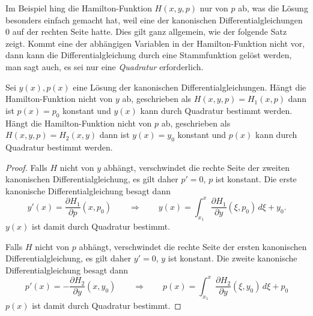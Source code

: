 Im Beispiel hing die Hamilton-Funktion $H(x,y,p)$ nur von $p$ ab,
was die Lösung besonders einfach gemacht hat, weil eine der kanonischen
Differentialgleichungen $0$ auf der rechten Seite hatte.
Dies gilt ganz allgemein, wie der folgende Satz zeigt.
Kommt eine der abhängigen Variablen in der Hamilton-Funktion nicht vor,
dann kann die Differentialgleichung durch eine Stammfunktion
gelöst werden, man sagt auch, es sei nur eine {\em Quadratur}
%
erforderlich.

\begin{satz}
Sei $y(x),p(x)$ eine Lösung der kanonischen Differentialgleichungen.
Hängt die Hamilton-Funktion nicht von $y$ ab, geschrieben als
$H(x,y,p)=H_1(x,p)$ dann ist $p(x)=p_0$ konstant und
$y(x)$ kann durch Quadratur bestimmt werden.
Hängt die Hamilton-Funktion nicht von $p$ ab, geschrieben als
$H(x,y,p)=H_2(x,y)$ dann ist $y(x)=y_0$ konstant und
$p(x)$ kann durch Quadratur bestimmt werden.
\end{satz}

\begin{proof}
Falls $H$ nicht von $y$ abhängt, verschwindet die rechte Seite der
zweiten kanonischen Differentialgleichung, es gilt daher $p'=0$,
$p$ ist konstant.
Die erste kanonische Differentialgleichung besagt dann
\[
y'(x)
=
\frac{\partial H_1}{\partial p}(x,p_0)
\qquad\Rightarrow\qquad
y(x)
=
\int_{x_1}^x
\frac{\partial H_1}{\partial y}(\xi,p_0)
\,d\xi
+ y_0.
\]
$y(x)$ ist damit durch Quadratur bestimmt.

Falls $H$ nicht von $p$ abhängt, verschwindet die rechte Seite
der ersten kanonischen Differentialgleichung, es gilt daher $y'=0$,
$y$ ist konstant.
Die zweite kanonische Differentialgleichung besagt dann
\[
p'(x)
=
-
\frac{\partial H_2}{\partial y}(x,y_0)
\qquad\Rightarrow\qquad
p(x)
=
\int_{x_1}^x
\frac{\partial H_2}{\partial y}(\xi,y_0)
\,d\xi
+
p_0
\]
$p(x)$ ist damit durch Quadratur bestimmt.
\end{proof}

%
%
